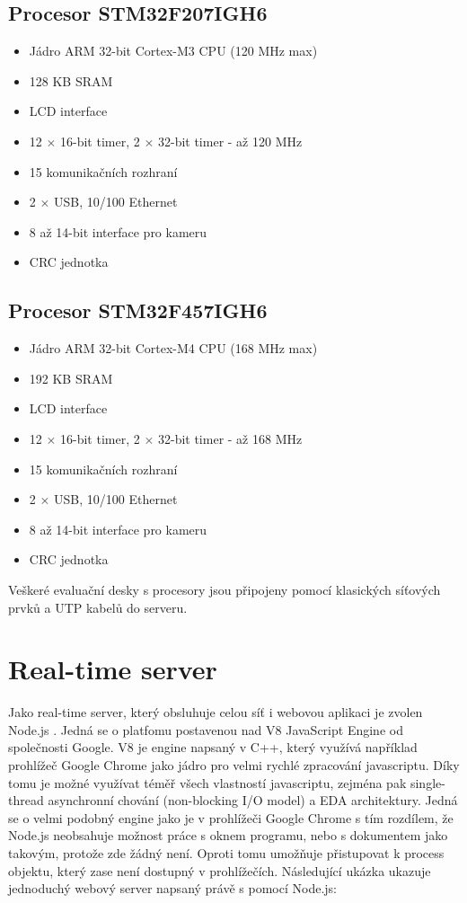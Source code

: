 \subsection{Procesor STM32F207IGH6}
\begin{itemize}
\itemsep0em
\item Jádro ARM 32-bit Cortex\texttrademark-M3 CPU (120 MHz max)
\item 128 KB SRAM
\item LCD interface
\item 12 \ensuremath{\times} 16-bit timer, 2 \ensuremath{\times} 32-bit timer - až 120 MHz
\item 15 komunikačních rozhraní
\item 2 \ensuremath{\times} USB, 10/100 Ethernet
\item 8 až 14-bit interface pro kameru
\item CRC jednotka
\end{itemize}

\subsection{Procesor STM32F457IGH6}
\begin{itemize}
\itemsep0em
\item Jádro ARM 32-bit Cortex\texttrademark-M4 CPU (168 MHz max)
\item 192 KB SRAM
\item LCD interface
\item 12 \ensuremath{\times} 16-bit timer, 2 \ensuremath{\times} 32-bit timer - až 168 MHz
\item 15 komunikačních rozhraní
\item 2 \ensuremath{\times} USB, 10/100 Ethernet
\item 8 až 14-bit interface pro kameru
\item CRC jednotka
\end{itemize}

Veškeré evaluační desky s procesory jsou připojeny pomocí klasických síťových prvků a UTP kabelů do serveru.

\section{Real-time server}
Jako real-time server, který obsluhuje celou síť i webovou aplikaci je zvolen Node.js \cite{nodejs}. Jedná se o platfomu postavenou nad V8 JavaScript Engine od společnosti Google. V8 je engine napsaný v C++, který využívá například prohlížeč Google Chrome jako jádro pro velmi rychlé zpracování javascriptu. Díky tomu je možné využívat téměř všech vlastností javascriptu, zejména pak single-thread asynchronní chování (non-blocking I/O model) a EDA architektury. Jedná se o velmi podobný engine jako je v prohlížeči Google Chrome s tím rozdílem, že Node.js neobsahuje možnost práce s oknem programu, nebo s dokumentem jako takovým, protože zde žádný není. Oproti tomu umožňuje přistupovat k process objektu, který zase není dostupný v prohlížečích. Následující ukázka ukazuje jednoduchý webový server napsaný právě s pomocí Node.js:

